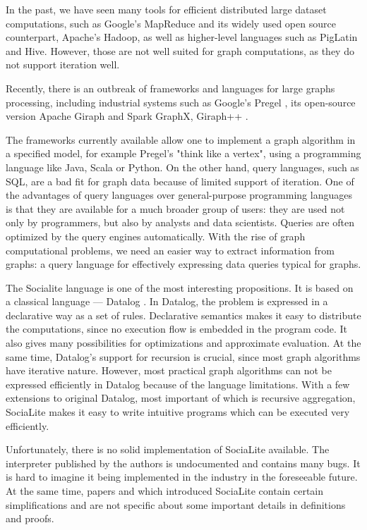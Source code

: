 \documentclass{pracamgr}
\theoremstyle{plain}
\theoremstyle{definition}
\theoremstyle{remark}
\begin{document}
In the past, we have seen many tools for efficient distributed large dataset computations, such as Google's MapReduce \cite{mapreduce} and its widely used open source counterpart, Apache's Hadoop, as well as higher-level languages such as PigLatin and Hive. However, those are not well suited for graph computations, as they do not support iteration well.

Recently, there is an outbreak of frameworks and languages for large graphs processing, including industrial systems such as Google's Pregel \cite{pregel}, its open-source version Apache Giraph and Spark GraphX, Giraph++ \cite{giraphpp}.

The frameworks currently available allow one to implement a graph algorithm in a specified model, for example Pregel's "think like a vertex", using a programming language like Java, Scala or Python. On the other hand, query languages, such as SQL, are a bad fit for graph data because of limited support of iteration. One of the advantages of query languages over general-purpose programming languages is that they are available for a much broader group of users: they are used not only by programmers, but also by analysts and data scientists. Queries are often optimized by the query engines automatically. With the rise of graph computational problems, we need an easier way to extract information from graphs: a query language for effectively expressing data queries typical for graphs.

The Socialite \cite{socialite, distsoc} language is one of the most interesting propositions. It is based on a classical language --- Datalog \cite{fod}. In Datalog, the problem is expressed in a declarative way as a set of rules. Declarative semantics makes it easy to distribute the computations, since no execution flow is embedded in the program code. It also gives many possibilities for optimizations and approximate evaluation. At the same time, Datalog's support for recursion is crucial, since most graph algorithms have iterative nature. However, most practical graph algorithms can not be expressed efficiently in Datalog because of the language limitations. With a few extensions to original Datalog, most important of which is recursive aggregation, SociaLite makes it easy to write intuitive programs which can be executed very efficiently.

Unfortunately, there is no solid implementation of SociaLite available. The interpreter published by the authors is undocumented and contains many bugs. It is hard to imagine it being implemented in the industry in the foreseeable future. At the same time, papers \cite{socialite} and \cite{distsoc} which introduced SociaLite contain certain simplifications and are not specific about some important details in definitions and proofs.
\end{document}
